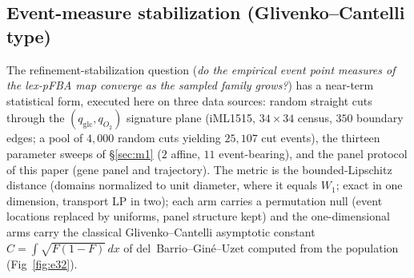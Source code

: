 \documentclass[11pt,a4paper]{article}
\theoremstyle{plain}
\theoremstyle{definition}
\theoremstyle{remark}
\begin{document}
\subsection{Event-measure stabilization
(Glivenko--Cantelli type)}\label{sec:e32}

The refinement-stabilization question
(\emph{do the empirical event point measures of the
lex-pFBA map converge as the sampled family grows?}) has a near-term statistical form, executed here on three data sources: random straight cuts through the $(q_{\mathrm{glc}}, q_{O_2})$ signature plane (iML1515, $34\times34$
census, $350$ boundary edges; a pool of $4{,}000$ random cuts
yielding $25{,}107$ cut events), the thirteen parameter sweeps of \S\ref{sec:m1} ($2$ affine, $11$ event-bearing), and the panel protocol of this paper (gene panel and trajectory). The metric is the bounded-Lipschitz
distance (domains normalized to unit diameter, where it equals
$W_1$; exact in one dimension, transport LP in two); each arm carries
a permutation null (event locations replaced by uniforms, panel
structure kept) and the one-dimensional arms carry the classical
Glivenko--Cantelli asymptotic constant
$C = \int\sqrt{F(1-F)}\,dx$ of del~Barrio--Gin\'e--Uzet computed from
the population (Fig~\ref{fig:e32}).
\end{document}

